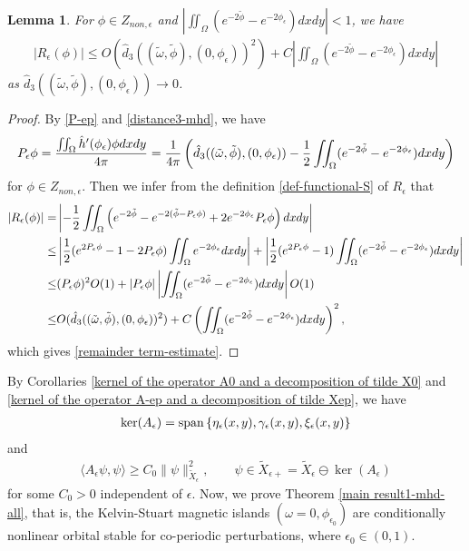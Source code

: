 \documentclass[1 [leqno, 11pt]{amsart}
\numberwithin{equation}{section}
\let\ep=\epsilon
\newtheorem{lemma}[Theorem]{Lemma}
\begin{document}
\begin{CJK*}{GBK}{song}
\begin{lemma}
For $\phi\in Z_{non,\ep}$ and $\left|\iint_{\Omega}(e^{-2\tilde \phi}-e^{-2\phi_\ep})dxdy\right|<1$, we have
\begin{align}\label{remainder term-estimate}
|R_\ep(\phi)|\leq O(\hat d_{3}((\tilde\omega,\tilde \phi),(0,\phi_\ep))^2)+C\left|\iint_{\Omega}(e^{-2\tilde \phi}-e^{-2\phi_\ep})dxdy\right|
\end{align}
as $\hat d_{3}((\tilde\omega,\tilde \phi),(0,\phi_\ep))\to0$.
\end{lemma}
\begin{proof}
By \eqref{P-ep} and \eqref{distance3-mhd}, we have
\begin{align*}
P_\ep\phi={\iint_\Omega\hat h'(\phi_\ep)\phi dxdy\over4\pi}={1\over 4\pi}\left(\hat d_{3}((\tilde\omega,\tilde \phi),(0,\phi_\ep))-{1\over2}\iint_\Omega(e^{-2\tilde \phi}-e^{-2\phi_\ep})dxdy\right)
\end{align*}
for $\phi\in Z_{non,\ep}$. Then we infer from the definition \eqref{def-functional-S} of $R_\ep$ that
\begin{align*}
|R_\ep(\phi)|=&\left|-{1\over 2}\iint_{\Omega}\left(e^{-2\tilde \phi}-e^{-2(\tilde \phi-P_\ep \phi)}+2e^{-2\phi_\ep}P_\ep\phi\right)dxdy\right|\\
\leq&\left|{1\over 2}(e^{2P_\ep \phi}-1-2P_\ep\phi)\iint_{\Omega}e^{-2\phi_\ep}dxdy\right|
+\left|{1\over 2}(e^{2P_\ep\phi}-1)\iint_{\Omega}(e^{-2\tilde \phi}-e^{-2\phi_\ep})dxdy\right|\\
\leq&(P_\ep\phi)^2O(1)+|P_\ep\phi|\left|\iint_{\Omega}(e^{-2\tilde \phi}-e^{-2\phi_\ep})dxdy\right|O(1)\\
\leq&O(\hat d_{3}((\tilde\omega,\tilde \phi),(0,\phi_\ep))^2)+C\left(\iint_{\Omega}(e^{-2\tilde \phi}-e^{-2\phi_\ep})dxdy\right)^2,
\end{align*}
which gives \eqref{remainder term-estimate}.
\end{proof}
By Corollaries \ref{kernel of  the operator A0 and a decomposition of tilde X0} and \ref{kernel of  the operator A-ep and a decomposition of tilde Xep}, we have
\begin{align*}
\ker ( A_\ep)={\rm{span}}\left\{\eta_\ep(x,y), \gamma_\ep(x,y), \xi_\ep(x,y)\right\}
\end{align*}
and
\begin{align}\label{A-ep-positive-lower-bound}
\langle  A_\ep \psi,\psi\rangle \geq C_0 \| \psi\|_{\tilde X_\ep}^2, \quad \quad \psi\in \tilde X_{\ep+}=\tilde X_\ep \ominus\ker ( A_\ep)
\end{align}
for some $C_0>0$ independent of $\ep$.
\fi
Now, we  prove Theorem \ref{main result1-mhd-all}, that is,  the Kelvin-Stuart magnetic islands $(\omega=0,\phi_{\ep_0})$ are  conditionally  nonlinear orbital stable  for co-periodic perturbations, where $\ep_0\in(0,1)$.


\end{CJK*}
\end{document}
